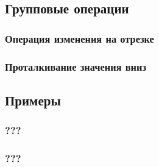 \documentclass[a4paper,12pt]{article}
\begin{document}
    \subsection{Групповые операции}
      \subsubsection{Операция изменения на отрезке}
      \subsubsection{Проталкивание значения вниз}

    \subsection{Примеры}
      \subsubsection{???}
      \subsubsection{???}
\end{document}
